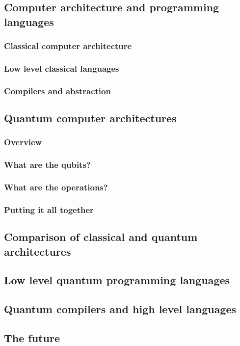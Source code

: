 \subsection{Computer architecture and programming languages}
\subsubsection{Classical computer architecture}
\subsubsection{Low level classical languages}
\subsubsection{Compilers and abstraction}
\subsection{Quantum computer architectures}
\subsubsection{Overview}
\subsubsection{What are the qubits?}
\subsubsection{What are the operations?}
\subsubsection{Putting it all together}
\subsection{Comparison of classical and quantum architectures}
\subsection{Low level quantum programming languages}
\subsection{Quantum compilers and high level languages}
\subsection{The future}
